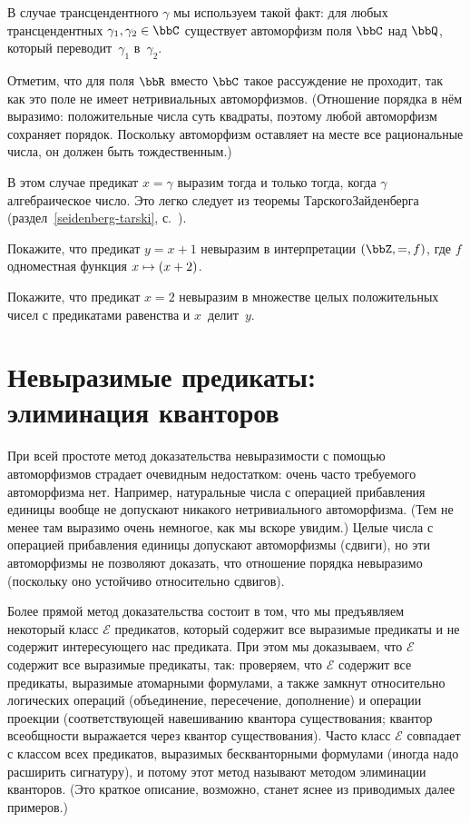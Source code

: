\begin{itemize}
В случае трансцендентного $\gamma$ мы используем такой
факт: для любых трансцендентных $\gamma_1, \gamma_2\hm\in\bbC$
существует автоморфизм поля $\bbC$ над $\bbQ$, который
переводит~$\gamma_1$ в~$\gamma_2$.

\label{r-definability}%
Отметим, что для поля $\bbR$ вместо $\bbC$ такое рассуждение не
проходит, так как это поле не имеет нетривиальных автоморфизмов.
(Отношение порядка в нём выразимо: положительные числа суть квадраты,
поэтому любой автоморфизм сохраняет порядок. Поскольку
автоморфизм оставляет на месте все рациональные числа, он должен
быть тождественным.)

В этом случае предикат $x=\gamma$ выразим тогда и только тогда,
когда $\gamma$\т алгебраическое число. Это легко следует из
теоремы Тарского\ч Зайденберга (раздел~\ref{seidenberg-tarski},
с.~\pageref{r-definability-2}).
\end{itemize}

\begin{problem}
Покажите, что предикат $y=x+1$ невыразим в интерпретации $(\bbZ,
{=}, f)$, где $f$\т одноместная функция $x\hm\mapsto(x+2)$.
\end{problem}

\begin{problem}
Покажите, что предикат $x=2$ невыразим в множестве целых
положительных чисел с предикатами равенства и  $x$~делит~$y$.
\end{problem}

\section
[Элиминация кванторов]
{Невыразимые предикаты: элиминация кванторов}
%
        \label{quantifier-elimination}%
При всей простоте метод доказательства невыразимости с помощью
автоморфизмов страдает очевидным недостатком: очень часто
требуемого автоморфизма нет. Например, натуральные числа с
операцией прибавления единицы вообще не допускают никакого
нетривиального автоморфизма. (Тем не менее там выразимо очень
немногое, как мы вскоре увидим.) Целые числа с операцией
прибавления единицы допускают автоморфизмы (сдвиги), но эти
автоморфизмы не позволяют доказать, что отношение порядка
невыразимо (поскольку оно устойчиво относительно сдвигов).

Более прямой метод доказательства состоит в том, что мы
предъявляем некоторый класс $\mathcal{E}$
предикатов, который содержит все
выразимые предикаты и не содержит интересующего нас предиката.
При этом мы доказываем, что $\mathcal{E}$ содержит все выразимые предикаты,
так: проверяем, что $\mathcal{E}$ содержит все предикаты,
выразимые атомарными формулами, а также замк\-нут относительно
логических операций (объединение, пересечение, дополнение) и
операции проекции (соответствующей навешиванию квантора
существования; квантор всеобщности выражается через квантор
существования). Часто класс $\mathcal{E}$ совпадает с классом всех
предикатов, выразимых бескванторными формулами (иногда надо
расширить сигнатуру), и потому этот метод называют методом 
элиминации кванторов. (Это краткое описание, возможно, станет
яснее из приводимых далее примеров.)

